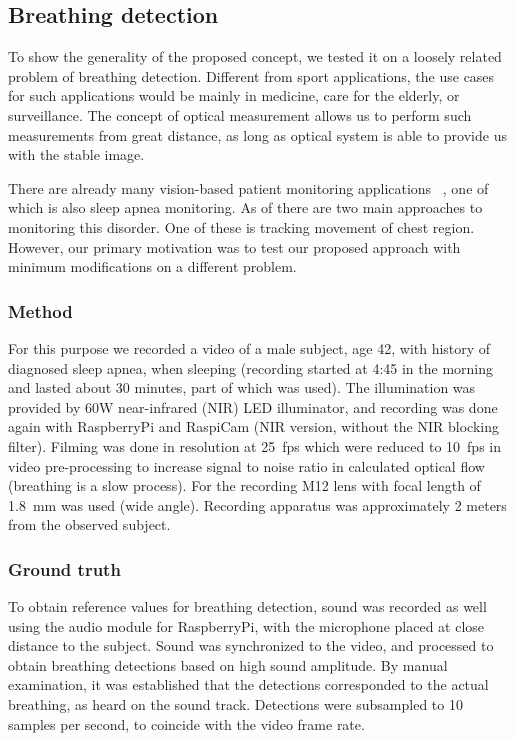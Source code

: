 \subsection{Breathing detection}

To show the generality of the proposed concept, we tested it on a loosely related problem of breathing detection. Different from sport applications, the use cases for such applications would be mainly in medicine, care for the elderly, or surveillance. The concept of optical measurement allows us to perform such measurements from great distance, as long as optical system is able to provide us with the stable image. 

There are already many vision-based patient monitoring applications~ \cite{sathyanarayana2015vision}, one of which is also sleep apnea monitoring. As of \cite{sathyanarayana2015vision} there are two main approaches to monitoring this disorder. One of these is tracking movement of chest region. However, our primary motivation was to test our proposed approach with minimum modifications on a different problem.

\subsubsection{Method}
For this purpose we recorded a video of a male subject, age 42, with history of diagnosed sleep apnea, when sleeping (recording started at 4:45 in the morning and lasted about 30 minutes, part of which was used). The illumination was provided by 60W near-infrared (NIR) LED illuminator, and recording was done again with RaspberryPi and RaspiCam (NIR version, without the NIR blocking filter). Filming was done in  resolution at \SI{25}{fps} which were reduced to \SI{10}{fps} in video pre-processing to increase signal to noise ratio in calculated optical flow (breathing is a slow process). For the recording M12 lens with focal length of \SI{1.8}{mm} was used (wide angle). Recording apparatus was approximately 2 meters from the observed subject. 

\subsubsection{Ground truth}
To obtain reference values for breathing detection, sound was recorded as well using the audio module for RaspberryPi, with the microphone placed at close distance to the subject. Sound was synchronized to the video, and processed to obtain breathing detections based on high sound amplitude. By manual examination, it was established that the detections corresponded to the actual breathing, as heard on the sound track. Detections were subsampled to 10 samples per second, to coincide with the video frame rate.

